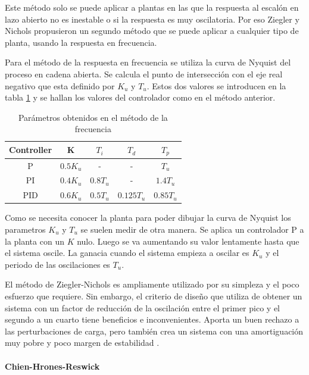 \documentclass{book}
\begin{document}
Este m\'etodo solo se puede aplicar a plantas en las que la respuesta al escal\'on en lazo abierto no es inestable o si la respuesta es muy oscilatoria. Por eso Ziegler y Nichols propusieron un segundo m\'etodo que se puede aplicar a cualquier tipo de planta, usando la respuesta en frecuencia. \par

Para el m\'etodo de la respuesta en frecuencia se utiliza la curva de Nyquist del proceso en cadena abierta. Se calcula el punto de intersecci\'on con el eje real negativo que esta definido por $K_{u}$ y $T_{u}$. Estos dos valores se introducen en la tabla \ref{ta:ZNfreq} y se hallan los valores del controlador como en el m\'etodo anterior. \par

\begin{table}[h!]
\centering
\caption{Par\'ametros obtenidos en el m\'etodo de la frecuencia \cite{PIDbook}}
\label{ta:ZNfreq}
\begin{tabular}{c|cccc}
Controller & K        & $T_{i}$  & $T_{d}$    & $T_{p}$   \\ \hline
P          & $0.5K_u$ & -        & -          & $T_u$     \\
PI         & $0.4K_u$ & $0.8T_u$ & -          & $1.4T_u$  \\
PID        & $0.6K_u$ & $0.5T_u$ & $0.125T_u$ & $0.85T_u$
\end{tabular}
\end{table}

Como se necesita conocer la planta para poder dibujar la curva de Nyquist los parametros $K_u$ y $T_u$ se suelen medir de otra manera. Se aplica un controlador P a la planta con un $K$ nulo. Luego se va aumentando su valor lentamente hasta que el sistema oscile. La ganacia cuando el sistema empieza a oscilar es $K_u$ y el periodo de las oscilaciones es $T_u$. \par

El m\'etodo de Ziegler-Nichols es ampliamente utilizado por su simpleza y el poco esfuerzo que requiere. Sin embargo, el criterio de diseño que utiliza de obtener un sistema con un factor de reducci\'on de la oscilaci\'on entre el primer pico y el segundo a un cuarto tiene beneficios e inconvenientes. Aporta un buen rechazo a las perturbaciones de carga, pero tambi\'en crea un sistema con una amortiguaci\'on muy pobre y poco margen de estabilidad \cite{PIDbook}. \par

		\paragraph{Chien-Hrones-Reswick}
\end{document}
